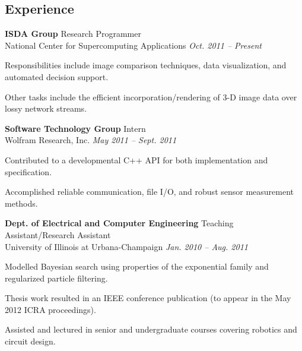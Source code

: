 \documentclass[margin, line]{resume}
\begin{document}
\begin{resume}
    \section{\mysidestyle Experience}
   
    \textbf{ISDA Group} \hfill Research Programmer\\  
    National Center for Supercomputing Applications \hfill \textsl{Oct. 2011 -- Present} \\
    \vspace{ -2 mm}
    \begin{list2}
        \item Responsibilities include image comparison techniques, data visualization, and automated decision support. 
        \item Other tasks include the efficient incorporation/rendering of 3-D image data over lossy network streams.  
    \end{list2}\vspace{-2mm}
   
    \textbf{Software Technology Group} \hfill Intern\\  
    Wolfram Research, Inc. \hfill \textsl{May 2011 -- Sept. 2011} \\
    \vspace{ -2 mm}
    \begin{list2}
        \item Contributed to a developmental C++ API for both implementation and specification.
	 \item Accomplished reliable communication, file I/O, and robust sensor measurement methods. 
    \end{list2}\vspace{-2mm}

    \textbf{Dept. of Electrical and Computer Engineering} \hfill Teaching Assistant/Research Assistant \\  
    University of Illinois at Urbana-Champaign \hfill \textsl{Jan. 2010 -- Aug. 2011} \\
    \vspace{ -2 mm}
    \begin{list2}
        \item Modelled Bayesian search using properties of the exponential family and regularized particle filtering.
	 \item Thesis work resulted in an IEEE conference publication (to appear in the May 2012 ICRA proceedings).  
        \item Assisted and lectured in senior and undergraduate courses covering robotics and circuit design.
    \end{list2}\vspace{-2mm}


\end{resume}
\end{document}
